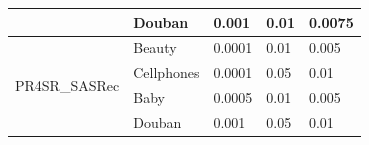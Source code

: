 \documentclass[10pt,journal,compsoc]{IEEEtran}
\begin{document}
\begin{table}[]
{\begin{tabular}{lllll}
                                                        & Douban     & 0.001         & 0.01  & 0.0075 \\ \hline
    \multirow{4}{*}{PR4SR\_SASRec}                      & Beauty     & 0.0001        & 0.01  & 0.005  \\
                                                        & Cellphones & 0.0001        & 0.05  & 0.01   \\
                                                        & Baby       & 0.0005        & 0.01  & 0.005  \\
                                                        & Douban     & 0.001         & 0.05  & 0.01   \\ \hline
    \end{tabular}
}
\label{hyper}
\end{table}
\end{document}
